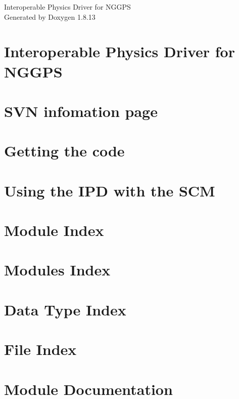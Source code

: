 \documentclass[twoside]{book}
\newcommand{\+}{\discretionary{\mbox{\scriptsize$\hookleftarrow$}}{}{}}
\newcommand{\clearemptydoublepage}{%
  \newpage{\pagestyle{empty}\cleardoublepage}%
}
\begin{document}
\begin{titlepage}
\vspace*{7cm}
\begin{center}%
{\Large Interoperable Physics Driver for N\+G\+G\+PS }\\
\vspace*{1cm}
{\large Generated by Doxygen 1.8.13}\\
\end{center}
\end{titlepage}
\clearemptydoublepage
{}
\tableofcontents
\clearemptydoublepage
{}

\chapter{Interoperable Physics Driver for N\+G\+G\+PS}
\label{index}
\chapter{S\+VN infomation page}
\label{log}

\chapter{Getting the code}
\label{code}

\chapter{Using the I\+PD with the S\+CM}
\label{scm}

\chapter{Module Index}

\chapter{Modules Index}

\chapter{Data Type Index}

\chapter{File Index}

\chapter{Module Documentation}


\end{document}
